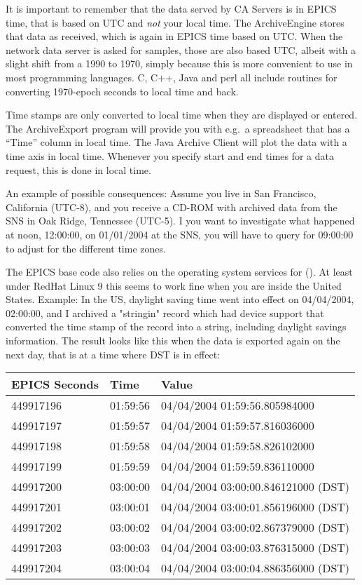 It is important to remember that the data served by CA Servers is in
EPICS time, that is based on UTC and \emph{not} your local time.  The
ArchiveEngine stores that data as received, which is again in EPICS
time based on UTC.  When the network data server is asked for samples,
those are also based UTC, albeit with a slight shift from a 1990 
to 1970, simply because this is more convenient to use in most
programming languages. C, C++, Java and perl all include routines for
converting 1970-epoch seconds to local time and back.

Time stamps are only converted to local time when they are displayed
or entered.  The ArchiveExport program will provide you with e.g.\ a
spreadsheet that has a ``Time'' column in local time. The Java Archive
Client will plot the data with a time axis in local time. Whenever you
specify start and end times for a data request, this is done in local
time.

An example of possible consequences: Assume you live in San Francisco,
California (UTC-8), and you receive a CD-ROM with archived data from the SNS
in Oak Ridge, Tennessee (UTC-5). I you want to investigate what happened
at noon, 12:00:00, on 01/01/2004 at the SNS, you will have to query for
09:00:00 to adjust for the different time zones.

The EPICS base code also relies on the operating system services for
 (). At least under RedHat Linux 9 this
seems to work fine when you are inside the United States.
Example: In the US, daylight saving time went into effect on
04/04/2004, 02:00:00, and I archived a "stringin" record which had
device support that converted the time stamp of the record into a string,
including daylight savings information.
The result looks like this when the data is exported again
on the next day, that is at a time where DST is in effect:

\medskip
\begin{tabular}{lll}
EPICS Seconds & Time     & Value \\
\hline
449917196     & 01:59:56 & 04/04/2004 01:59:56.805984000 \\
449917197     & 01:59:57 & 04/04/2004 01:59:57.816036000 \\
449917198     & 01:59:58 & 04/04/2004 01:59:58.826102000 \\
449917199     & 01:59:59 & 04/04/2004 01:59:59.836110000 \\
449917200     & 03:00:00 & 04/04/2004 03:00:00.846121000 (DST) \\
449917201     & 03:00:01 & 04/04/2004 03:00:01.856196000 (DST) \\
449917202     & 03:00:02 & 04/04/2004 03:00:02.867379000 (DST) \\
449917203     & 03:00:03 & 04/04/2004 03:00:03.876315000 (DST) \\
449917204     & 03:00:04 & 04/04/2004 03:00:04.886356000 (DST) 
\end{tabular}

